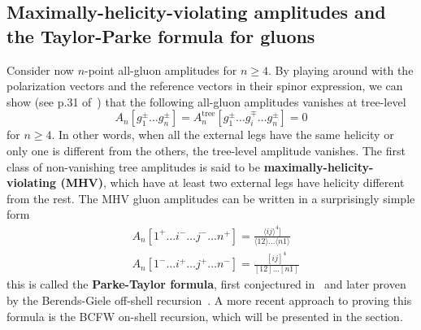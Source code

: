 \subsection*{Maximally-helicity-violating amplitudes and the Taylor-Parke formula for gluons}
Consider now $n$-point all-gluon amplitudes for $n\geq 4$. 
By playing around with the polarization vectors and the reference vectors in their spinor expression, we can show (see p.31 of~\cite{Elvang:2013cua}) that the following all-gluon amplitudes vanishes at tree-level
\begin{equation*}
A_n[g_1^\pm \ldots g_n^\pm] = A^{\mathrm{tree}}_n[g_1^\pm \ldots g_i^\mp \ldots g_n^\pm] = 0
\end{equation*}
for $n\geq 4$.
In other words, when all the external legs have the same helicity or only one is different from the others, the tree-level amplitude vanishes.
The first class of non-vanishing tree amplitudes is said to be \textbf{maximally-helicity-violating (MHV)}, which have at least two external legs have helicity different from the rest.
The MHV gluon amplitudes can be written in a surprisingly simple form
\begin{equation*}
\begin{split}
& A_n[1^+\ldots i^-\ldots j^-\ldots n^+] = 
\frac{\langle ij \rangle^4]}{\langle 12 \rangle\ldots \langle n1 \rangle}
\\
& A_n[1^-\ldots i^+\ldots j^+\ldots n^-] = 
\frac{[ ij]^4}{[ 12 ]\ldots [n1 ]}
\end{split}
\end{equation*}
this is called the \textbf{Parke-Taylor formula}, first conjectured in~\cite{PhysRevLett.56.2459} and later proven by the Berends-Giele off-shell recursion~\cite{BERENDS1988759}. 
A more recent approach to proving this formula is the BCFW on-shell recursion, which will be presented in the section. 






